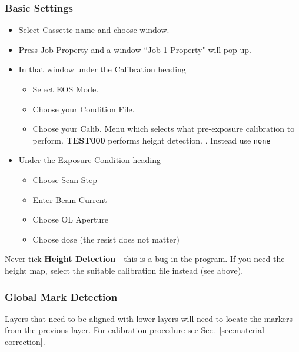 \subsubsection{Basic Settings}
\label{sec:basic-settings}

\begin{itemize}
\item Select Cassette name and choose window.
\item Press Job Property and a window ``Job 1 Property" will pop up.
\item In that window under the Calibration heading
  \begin{itemize}
  \item Select EOS Mode.
  \item Choose your Condition File.
  \item Choose your Calib. Menu which selects what pre-exposure calibration to perform. \textbf{TEST000} performs height detection. . Instead use \texttt{none}
  \end{itemize}
\item Under the Exposure Condition heading
  \begin{itemize}
  \item Choose Scan Step
  \item Enter Beam Current
  \item Choose OL Aperture
  \item Choose dose (the resist does not matter)
  \end{itemize}
\end{itemize}

\begin{framed}\noindent
  Never tick \textbf{Height Detection} - this is a bug in the program. If you need the height map, select the suitable calibration file instead (see above).
\end{framed}

\newpage
\subsubsection{Global Mark Detection}
\label{sec:glob-mark-detect}

\begin{framed}\noindent
  Layers that  need to  be aligned  with lower  layers will  need to  locate the
  markers from the previous layer. For calibration procedure see Sec.~\ref{sec:material-correction}.
\end{framed}

